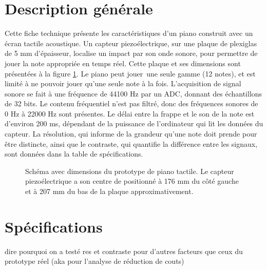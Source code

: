 \documentclass[11pt,letterpaper]{article}
\begin{document}

\section{Description générale}




Cette fiche technique présente les caractéristiques d'un piano construit avec un
écran tactile acoustique. Un capteur piezoélectrique, sur une plaque de plexiglas 
de 5 mm d'épaisseur, localise un impact par son onde sonore, pour permettre 
de jouer la note appropriée en temps réel. Cette plaque 
et ses dimensions sont présentées à la figure \ref{piano_fig}. Le piano peut jouer\
une seule gamme (12 notes), et est limité à ne pouvoir jouer qu'une seule note à 
la fois. L'acquisition de signal sonore se fait à une fréquence de 44100 Hz par un
ADC, donnant des échantillons de 32 bits. Le contenu fréquentiel n'est pas filtré,
donc des fréquences sonores de 0 Hz à 22000 Hz sont présentes. Le délai entre la frappe
et le son de la note est d'environ 200 ms,
dépendant de la puissance de l'ordinateur qui lit les données du capteur. La résolution,
qui informe de la grandeur qu'une note doit prende pour être distincte, ainsi que le
contraste, qui quantifie la différence entre les signaux, sont données dans la table de
spécifications.

\begin{figure}[H]
  \centering
  
  \caption{Schéma avec dimensions du prototype de piano tactile. Le capteur
  piezoélectrique a son centre de positionné à 176 mm du côté gauche et à 207 mm
  du bas de la plaque approximativement.}
  \label{piano_fig}
\end{figure}



\section{Spécifications}

dire pourquoi on a testé res et contraste pour d'autres facteurs que ceux du prototype réel (aka pour l'analyse de réduction de couts)
\end{document}
